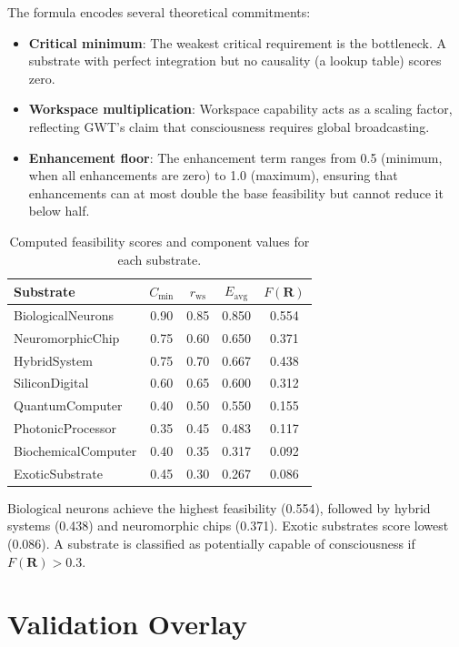 \documentclass[12pt,a4paper]{article}
\begin{document}
The formula encodes several theoretical commitments:
\begin{itemize}
    \item \textbf{Critical minimum}: The weakest critical requirement is the bottleneck. A substrate with perfect integration but no causality (a lookup table) scores zero.
    \item \textbf{Workspace multiplication}: Workspace capability acts as a scaling factor, reflecting GWT's claim that consciousness requires global broadcasting.
    \item \textbf{Enhancement floor}: The enhancement term ranges from 0.5 (minimum, when all enhancements are zero) to 1.0 (maximum), ensuring that enhancements can at most double the base feasibility but cannot reduce it below half.
\end{itemize}

\begin{table}[H]
\centering
\caption{Computed feasibility scores and component values for each substrate.}
\label{tab:feasibility}
\begin{tabular}{lcccc}
\toprule
\textbf{Substrate} & $C_{\min}$ & $r_{\text{ws}}$ & $E_{\text{avg}}$ & $F(\mathbf{R})$ \\
\midrule
BiologicalNeurons & 0.90 & 0.85 & 0.850 & 0.554 \\
NeuromorphicChip & 0.75 & 0.60 & 0.650 & 0.371 \\
HybridSystem & 0.75 & 0.70 & 0.667 & 0.438 \\
SiliconDigital & 0.60 & 0.65 & 0.600 & 0.312 \\
QuantumComputer & 0.40 & 0.50 & 0.550 & 0.155 \\
PhotonicProcessor & 0.35 & 0.45 & 0.483 & 0.117 \\
BiochemicalComputer & 0.40 & 0.35 & 0.317 & 0.092 \\
ExoticSubstrate & 0.45 & 0.30 & 0.267 & 0.086 \\
\bottomrule
\end{tabular}
\end{table}

Biological neurons achieve the highest feasibility (0.554), followed by hybrid systems (0.438) and neuromorphic chips (0.371). Exotic substrates score lowest (0.086). A substrate is classified as potentially capable of consciousness if $F(\mathbf{R}) > 0.3$.

\section{Validation Overlay}
\end{document}

